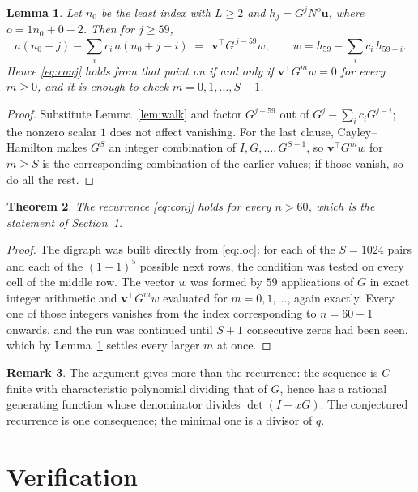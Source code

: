 \documentclass[11pt,a4paper]{article}
\theoremstyle{plain}
\newtheorem{theorem}{Theorem}
\newtheorem{lemma}[theorem]{Lemma}
\theoremstyle{definition}
\newtheorem{remark}[theorem]{Remark}
\begin{document}
\begin{lemma}\label{lem:crit}
Let $n_0$ be the least index with $L\ge2$ and $h_j=G^{j}N^{o}\mathbf{u}$, where
$o=1n_0+0-2$. Then for $j\ge59$,
\[
a(n_0+j)-\sum_i c_i\,a(n_0+j-i)\;=\;\,\mathbf{v}^{\!\top}G^{\,j-59}w,
\qquad w=h_{59}-\sum_i c_i\,h_{59-i} .
\]
Hence \eqref{eq:conj} holds from that point on if and only if
$\mathbf{v}^{\!\top}G^{m}w=0$ for every $m\ge0$, and it is enough to check
$m=0,1,\dots,S-1$.
\end{lemma}

\begin{proof}
Substitute Lemma~\ref{lem:walk} and factor $G^{j-59}$ out of
$G^{j}-\sum_ic_iG^{j-i}$; the nonzero scalar $1$ does not affect
vanishing. For the last clause, Cayley--Hamilton makes $G^{S}$ an integer combination of
$I,G,\dots,G^{S-1}$, so $\mathbf{v}^{\!\top}G^{m}w$ for $m\ge S$ is the corresponding
combination of the earlier values; if those vanish, so do all the rest.
\end{proof}

\begin{theorem}
The recurrence \eqref{eq:conj} holds for every $n>60$, which is the statement of
Section~1.
\end{theorem}

\begin{proof}
The digraph was built directly from \eqref{eq:loc}: for each of the $S=1024$ pairs and each
of the $(1+1)^{5}$ possible next rows, the condition was tested on every cell of
the middle row. The vector $w$ was formed by $59$ applications of $G$ in exact integer
arithmetic and $\mathbf{v}^{\!\top}G^{m}w$ evaluated for $m=0,1,\dots$, again exactly.
Every one of those integers vanishes from the index corresponding to $n=60+1$ onwards,
and the run was continued until $S+1$ consecutive zeros had been seen, which by
Lemma~\ref{lem:crit} settles every larger $m$ at once.
\end{proof}

\begin{remark}
The argument gives more than the recurrence: the sequence is $C$-finite with characteristic
polynomial dividing that of $G$, hence has a rational generating function whose denominator
divides $\det(I-xG)$. The conjectured recurrence is one consequence; the minimal one is a
divisor of $q$.
\end{remark}

\section{Verification}
\end{document}
